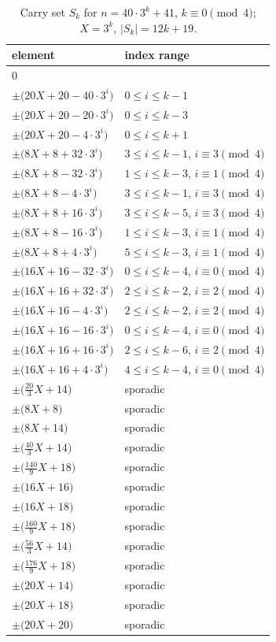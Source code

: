 \begin{table}[htbp]\centering\small
\caption{Carry set $S_k$ for $n=40\cdot 3^k + 41$, $k\equiv 0\pmod{4}$; $X=3^k$, $|S_k|=12k+19$.}
\begin{tabular}{ll}\toprule
element & index range \\ \midrule
$0$ & \\
$\pm\bigl(20X + 20 - 40\cdot 3^i\bigr)$ & $0\le i\le k-1$ \\
$\pm\bigl(20X + 20 - 20\cdot 3^i\bigr)$ & $0\le i\le k-3$ \\
$\pm\bigl(20X + 20 - 4\cdot 3^i\bigr)$ & $0\le i\le k+1$ \\
$\pm\bigl(8X + 8 + 32\cdot 3^i\bigr)$ & $3\le i\le k-1$, $i\equiv 3\pmod 4$ \\
$\pm\bigl(8X + 8 - 32\cdot 3^i\bigr)$ & $1\le i\le k-3$, $i\equiv 1\pmod 4$ \\
$\pm\bigl(8X + 8 - 4\cdot 3^i\bigr)$ & $3\le i\le k-1$, $i\equiv 3\pmod 4$ \\
$\pm\bigl(8X + 8 + 16\cdot 3^i\bigr)$ & $3\le i\le k-5$, $i\equiv 3\pmod 4$ \\
$\pm\bigl(8X + 8 - 16\cdot 3^i\bigr)$ & $1\le i\le k-3$, $i\equiv 1\pmod 4$ \\
$\pm\bigl(8X + 8 + 4\cdot 3^i\bigr)$ & $5\le i\le k-3$, $i\equiv 1\pmod 4$ \\
$\pm\bigl(16X + 16 - 32\cdot 3^i\bigr)$ & $0\le i\le k-4$, $i\equiv 0\pmod 4$ \\
$\pm\bigl(16X + 16 + 32\cdot 3^i\bigr)$ & $2\le i\le k-2$, $i\equiv 2\pmod 4$ \\
$\pm\bigl(16X + 16 - 4\cdot 3^i\bigr)$ & $2\le i\le k-2$, $i\equiv 2\pmod 4$ \\
$\pm\bigl(16X + 16 - 16\cdot 3^i\bigr)$ & $0\le i\le k-4$, $i\equiv 0\pmod 4$ \\
$\pm\bigl(16X + 16 + 16\cdot 3^i\bigr)$ & $2\le i\le k-6$, $i\equiv 2\pmod 4$ \\
$\pm\bigl(16X + 16 + 4\cdot 3^i\bigr)$ & $4\le i\le k-4$, $i\equiv 0\pmod 4$ \\
$\pm\bigl(\tfrac{20}{3}X + 14\bigr)$ & sporadic \\
$\pm\bigl(8X + 8\bigr)$ & sporadic \\
$\pm\bigl(8X + 14\bigr)$ & sporadic \\
$\pm\bigl(\tfrac{40}{3}X + 14\bigr)$ & sporadic \\
$\pm\bigl(\tfrac{140}{9}X + 18\bigr)$ & sporadic \\
$\pm\bigl(16X + 16\bigr)$ & sporadic \\
$\pm\bigl(16X + 18\bigr)$ & sporadic \\
$\pm\bigl(\tfrac{160}{9}X + 18\bigr)$ & sporadic \\
$\pm\bigl(\tfrac{56}{3}X + 14\bigr)$ & sporadic \\
$\pm\bigl(\tfrac{176}{9}X + 18\bigr)$ & sporadic \\
$\pm\bigl(20X + 14\bigr)$ & sporadic \\
$\pm\bigl(20X + 18\bigr)$ & sporadic \\
$\pm\bigl(20X + 20\bigr)$ & sporadic \\
\bottomrule\end{tabular}\end{table}
